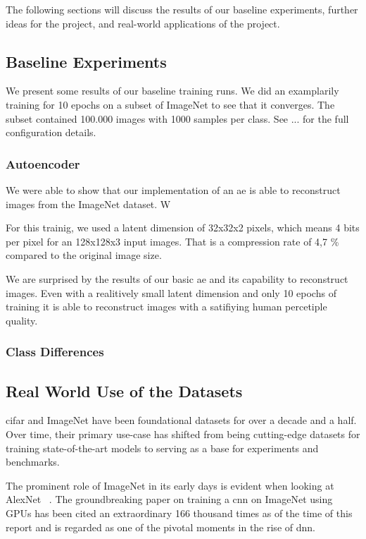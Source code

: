The following sections will discuss the results of our baseline experiments, further ideas for the project, and real-world applications of the project.

\subsection{Baseline Experiments}\label{subsec:baseline-results}
    We present some results of our baseline training runs. We did an examplarily training for 10 epochs on a subset of ImageNet to see that it converges. The subset contained 100.000 images with 1000 samples per class. See ... for the full configuration details.

    \subsubsection{Autoencoder}\label{subsubsec:autoencoder}
        We were able to show that our implementation of an \ac{ae} is able to reconstruct images from the ImageNet dataset. W

        For this trainig, we used a latent dimension of 32x32x2 pixels, which means 4 bits per pixel for an 128x128x3 input images. That is a compression rate of 4,7 \% compared to the original image size.

        We are surprised by the results of our basic \ac{ae} and its capability to reconstruct images. Even with a realitively small latent dimension and only 10 epochs of training it is able to reconstruct images with a satifiying human percetiple quality.
        

\subsubsection{Class Differences}\label{subsubsec:class-differences}

\subsection{Real World Use of the Datasets}\label{subsec:real-world-applications}
\ac{cifar} and ImageNet have been foundational datasets for over a decade and a half.
Over time, their primary use-case has shifted from being cutting-edge datasets for training state-of-the-art models
to serving as a base for experiments and benchmarks.

The prominent role of ImageNet in its early days is evident when looking at AlexNet ~\cite{AlexNet}.
The groundbreaking paper on training a \ac{cnn} on ImageNet using GPUs has been cited an extraordinary 166 thousand
times as of the time of this report and is regarded as one of the pivotal moments in the rise of \ac{dnn}.

